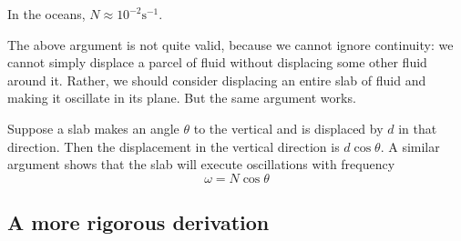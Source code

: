 In the oceans, $N \approx 10^{-2}\mathrm{s^{-1}}$.

The above argument is not quite valid, because we cannot ignore continuity: we cannot simply displace a parcel of fluid without displacing some other fluid around it. Rather, we should consider displacing an entire slab of fluid and making it oscillate in its plane. But the same argument works.

Suppose a slab makes an angle $\theta$ to the vertical and is displaced by $d$ in that direction. Then the displacement in the vertical direction is $d\cos\theta$. A similar argument shows that the slab will execute oscillations with frequency
\begin{equation}
	\omega = N\cos\theta
	\label{igwdisprel-theta}
\end{equation}

\subsection{A more rigorous derivation}

